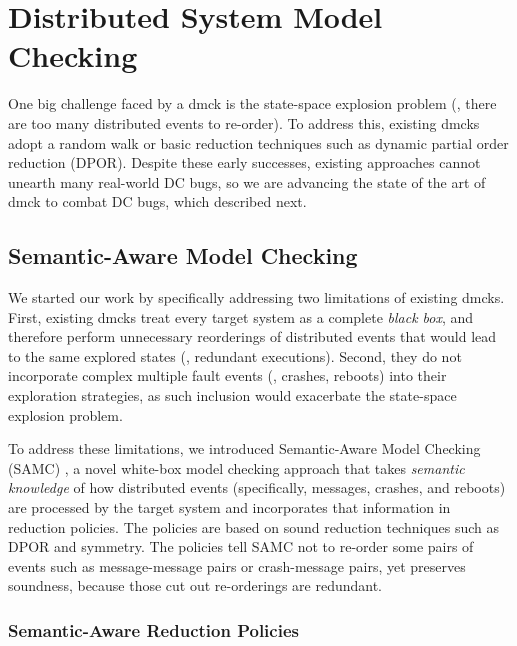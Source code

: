\section{Distributed System Model Checking}

One big challenge faced by a dmck is the state-space explosion problem (\ie,
there are too many distributed events to re-order). To address this, existing
dmcks adopt a random walk or basic reduction techniques such as dynamic partial
order reduction (DPOR). Despite these early successes, existing approaches
cannot unearth many real-world DC bugs, so we are advancing the state of the art
of dmck to combat DC bugs, which described next.

\subsection{Semantic-Aware Model Checking}

We started our work by specifically addressing two limitations of existing dmcks.
First, existing dmcks treat every target system as a complete \textit{black
box}, and therefore perform unnecessary reorderings of distributed events that
would lead to the same explored states (\ie, redundant executions). Second, they
do not incorporate complex multiple fault events (\eg, crashes, reboots) into
their exploration strategies, as such inclusion would exacerbate the state-space
explosion problem.

To address these limitations, we introduced Semantic-Aware Model Checking (SAMC)
\cite{Leesatapornwongsa+15-SamcIssta, Leesatapornwongsa+14-Samc}, a novel
white-box model checking approach that takes \textit{semantic knowledge} of how
distributed events (specifically, messages, crashes, and reboots) are processed
by the target system and incorporates that information in reduction policies.
The policies are based on sound reduction techniques such as DPOR and symmetry.
The policies tell SAMC not to re-order some pairs of events such as
message-message pairs or crash-message pairs, yet preserves soundness, because
those cut out re-orderings are redundant.

\subsubsection{Semantic-Aware Reduction Policies}

